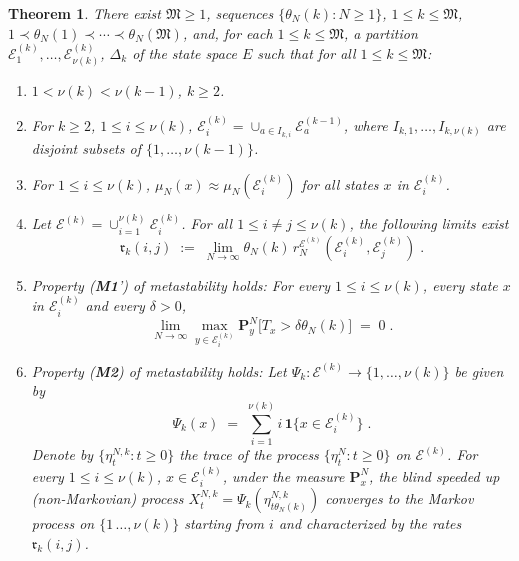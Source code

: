 \documentclass[reqno]{amsart}
\newtheorem{theorem}{Theorem}[section]
\begin{document}
\begin{theorem}
\label{s19} 
There exist ${{\mathfrak M}} \ge 1$, sequences $\{\theta_N(k) : N\ge 1\}$, $1\le
k\le {{\mathfrak M}}$, $1 \prec \theta_N(1) \prec \cdots \prec \theta_N({{\mathfrak M}})$,
and, for each $1\le k\le {{\mathfrak M}}$, a partition ${{\mathcal E}}^{(k)}_1, \dots,
{{\mathcal E}}^{(k)}_{\nu(k)}$, $\Delta_k$ of the state space $E$ such that for
all $1\le k\le {{\mathfrak M}}$:

\begin{enumerate}
\item $1< \nu(k)<\nu(k-1)$, $k\ge 2$.

\item For $k\ge 2$, $1\le i\le \nu(k)$, ${{\mathcal E}}^{(k)}_i = \cup_{a\in
    I_{k,i}} {{\mathcal E}}^{(k-1)}_a$, where $I_{k,1}, \dots, I_{k,\nu(k)}$
  are disjoint subsets of $\{1, \dots, \nu(k-1)\}$.

\item For $1\le i\le \nu(k)$, $\mu_N(x) \approx \mu_N({{\mathcal E}}^{(k)}_i)$ for
  all states $x$ in ${{\mathcal E}}^{(k)}_i$.

\item Let ${{\mathcal E}}^{(k)} = \cup_{i=1}^{\nu(k)} {{\mathcal E}}^{(k)}_i$.  For all
  $1\le i \not = j \le \nu(k)$, the following limits exist
\begin{equation*}
{{\mathfrak r}}_k (i,j) \;:=\;
\lim_{N\to \infty} \theta_N(k) \, r^{{{\mathcal E}}^{(k)}}_N({{\mathcal E}}^{(k)}_i, {{\mathcal E}}^{(k)}_j) \;.
\end{equation*}

\item Property {\rm ({\bf M1}')} of metastability holds: For every
  $1\le i\le \nu(k)$, every state $x$ in ${{\mathcal E}}^{(k)}_i$ and
  every $\delta>0$,
\begin{equation*}
\lim_{N\to \infty} \max_{y\in {{\mathcal E}}^{(k)}_i} {{\mathbf P}}^N_y \big[
T_{x} > \delta \theta_N(k) \big] \;=\; 0\;. 
\end{equation*}

\item Property {\rm ({\bf M2})} of metastability holds: Let $\Psi_k :
  {{\mathcal E}}^{(k)} \to \{1, \dots, \nu(k)\}$ be given by
\begin{equation*}
\Psi_k (x) \;=\; \sum_{i=1}^{\nu(k)} i\, {{\mathbf 1}}\{ x\in {{\mathcal E}}_i^{(k)} \}\; .
\end{equation*}
Denote by $\{\eta^{N, k}_t : t\ge 0\}$ the trace of the process
$\{\eta^{N}_t : t\ge 0\}$ on ${{\mathcal E}}^{(k)}$. For every $1\le i\le
\nu(k)$, $x\in {{\mathcal E}}_i^{(k)}$, under the measure ${{\mathbf P}}^N_x$, the
blind speeded up (non-Markovian) process $X^{N,k}_{t} =
\Psi_k(\eta^{N, k}_{t \theta_N(k)})$ converges to the Markov process
on $\{1\, \dots, \nu(k)\}$ starting from $i$ and characterized by the
rates ${{\mathfrak r}}_k(i,j)$.


\end{enumerate}
\end{theorem}
\end{document}
